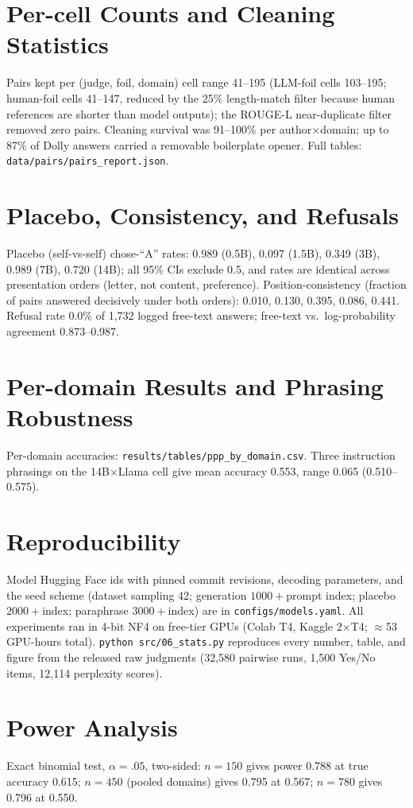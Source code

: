 \documentclass[11pt]{article}
\begin{document}
\section{Per-cell Counts and Cleaning Statistics}\label{app:cells}
Pairs kept per (judge, foil, domain) cell range 41--195 (LLM-foil cells
103--195; human-foil cells 41--147, reduced by the 25\% length-match
filter because human references are shorter than model outputs); the
ROUGE-L near-duplicate filter removed zero pairs. Cleaning survival was
91--100\% per author$\times$domain; up to 87\% of Dolly answers carried a
removable boilerplate opener. Full tables:
\texttt{data/pairs/pairs\_report.json}.

\section{Placebo, Consistency, and Refusals}\label{app:bias}
Placebo (self-vs-self) chose-``A'' rates: 0.989 (0.5B), 0.097 (1.5B),
0.349 (3B), 0.989 (7B), 0.720 (14B); all 95\% CIs exclude 0.5, and rates
are identical across presentation orders (letter, not content,
preference). Position-consistency (fraction of pairs answered decisively
under both orders): 0.010, 0.130, 0.395, 0.086, 0.441. Refusal rate 0.0\%
of 1{,}732 logged free-text answers; free-text vs.\ log-probability
agreement 0.873--0.987.

\section{Per-domain Results and Phrasing Robustness}
Per-domain accuracies: \texttt{results/tables/ppp\_by\_domain.csv}.
Three instruction phrasings on the 14B$\times$Llama cell give mean
accuracy 0.553, range 0.065 (0.510--0.575).

\section{Reproducibility}\label{app:repro}
Model Hugging Face ids with pinned commit revisions, decoding parameters,
and the seed scheme (dataset sampling 42; generation $1000+$prompt index;
placebo $2000+$index; paraphrase $3000+$index) are in
\texttt{configs/models.yaml}. All experiments ran in 4-bit NF4 on free-tier
GPUs (Colab T4, Kaggle 2$\times$T4; $\approx$53 GPU-hours total).
\texttt{python src/06\_stats.py} reproduces every number, table, and
figure from the released raw judgments (32{,}580 pairwise runs, 1{,}500
Yes/No items, 12{,}114 perplexity scores).

\section{Power Analysis}\label{app:power}
Exact binomial test, $\alpha = .05$, two-sided: $n{=}150$ gives power
0.788 at true accuracy 0.615; $n{=}450$ (pooled domains) gives 0.795 at
0.567; $n{=}780$ gives 0.796 at 0.550.
\end{document}

